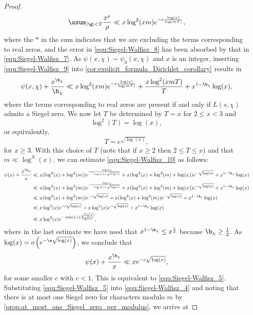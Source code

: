 \begin{proof}
\begin{equation}
        \asum_{|\g| < T}\frac{x^{\rho}}{\rho} \ll x\log^{2}(xm)e^{-c\frac{\log(x)}{\log(mT)}},
      \end{equation}
      where the \(\ast\) in the sum indicates that we are excluding the terms corresponding to real zeros, and the error in \cref{equ:Siegel-Walfisz_8} has been absorbed by that in \cref{equ:Siegel-Walfisz_7}. As \(\psi(x,\chi) \sim \psi_{0}(x,\chi)\) and \(x\) is an integer, inserting \cref{equ:Siegel-Walfisz_9} into \cref{cor:explicit_formula_Dirichlet_corollary} results in
      \begin{equation}\label{equ:Siegel-Walfisz_10}
        \psi(x,\chi)+\frac{x^{\b_{\chi}}}{\b_{\chi}} \ll x\log^{2}(xm)e^{-c\frac{\log(x)}{\log(mT)}}+\frac{x\log^{2}(xmT)}{T}+x^{1-\b_{\chi}}\log(x),
      \end{equation}
      where the terms corresponding to real zeros are present if and only if \(L(s,\chi)\) admits a Siegel zero. We now let \(T\) be determined by \(T = x\) for \(2 \le x < 3\) and
      \[
        \log^{2}(T) = \log(x),
      \]
      or equivalently,
      \[
        T = e^{\sqrt{\log(x)}},
      \]
      for \(x \ge 3\). With this choice of \(T\) (note that if \(x \ge 2\) then \(2 \le T \le x\)) and that \(m \ll \log^{N}(x)\), we can estimate \cref{equ:Siegel-Walfisz_10} as follows:
      \begin{align*}
        \psi(x)+\frac{x^{\b_{\chi}}}{x} &\ll x(\log^{2}(x)+\log^{2}(m))e^{-c\frac{\log(x)}{\log(m)+\sqrt{\log(x)}}}+x(\log^{2}(x)+\log^{2}(m)+\log(x))e^{-\sqrt{\log(x)}}+x^{1-\b_{\chi}}\log(x) \\
        &\ll x(\log^{2}(x)+\log^{2}(m))e^{-c\frac{\log(x)}{\log(m)+\sqrt{\log(x)}}}+x(\log^{2}(x)+\log^{2}(m)+\log(x))e^{-\sqrt{\log(x)}}+x^{1-\b_{\chi}}\log(x) \\
        &\ll x(\log^{2}(x)+\log^{2}(m))e^{-c\sqrt{\log(x)}}+x(\log^{2}(x)+\log^{2}(m))e^{-\sqrt{\log(x)}}+x^{1-\b_{\chi}}\log(x) \\
        &\ll x\log^{2}(x)e^{-c\sqrt{\log(x)}}+x\log^{2}(x)e^{-\sqrt{\log(x)}}+x^{1-\b_{\chi}}\log(x) \\
        &\ll x\log^{2}(x)e^{-\min(1,c)\frac{\sqrt{\log(x)}}{\log(m)}},
      \end{align*}
      where in the last estimate we have used that \(x^{1-\b_{\chi}} \le x^{\frac{1}{2}}\) because \(\b_{\chi} \ge \frac{1}{2}\). As \(\log(x) = o\left(e^{-\e\sqrt{\log(x)}}\right)\), we conclude that
      \[
        \psi(x)+\frac{x^{\b_{\chi}}}{x} \ll xe^{-c\sqrt{\log(x)}},
      \]
      for some smaller \(c\) with \(c < 1\). This is equivalent to \cref{equ:Siegel-Walfisz_5}. Substituting \cref{equ:Siegel-Walfisz_5} into \cref{equ:Siegel-Walfisz_4} and noting that there is at most one Siegel zero for characters modulo \(m\) by \cref{prop:at_most_one_Siegel_zero_per_modulus}, we arrive at

\end{proof}
